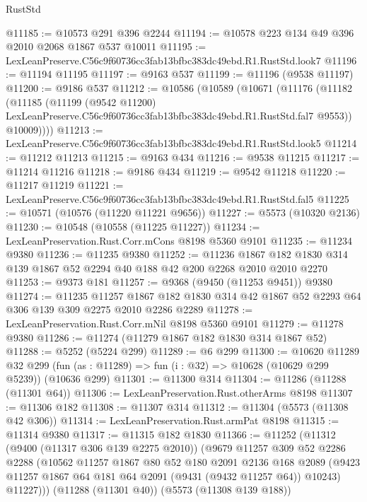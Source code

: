\begin{lexlean}{RustStd}
\begin{coremodule}
@11185 := @10573 @291 @396 @2244
@11194 := @10578 @223 @134 @49 @396 @2010 @2068 @1867 @537 @10011
@11195 := LexLeanPreserve.C56c9f60736cc3fab13bfbc383dc49ebd.R1.RustStd.look7
@11196 := @11194 @11195
@11197 := @9163 @537
@11199 := @11196 (@9538 @11197)
@11200 := @9186 @537
@11212 := @10586
    (@10589
      (@10671
        (@11176
          (@11182
            (@11185
              (@11199
                (@9542 @11200)
                LexLeanPreserve.C56c9f60736cc3fab13bfbc383dc49ebd.R1.RustStd.fal7
                @9553))
            @10009))))
@11213 := LexLeanPreserve.C56c9f60736cc3fab13bfbc383dc49ebd.R1.RustStd.look5
@11214 := @11212 @11213
@11215 := @9163 @434
@11216 := @9538 @11215
@11217 := @11214 @11216
@11218 := @9186 @434
@11219 := @9542 @11218
@11220 := @11217 @11219
@11221 := LexLeanPreserve.C56c9f60736cc3fab13bfbc383dc49ebd.R1.RustStd.fal5
@11225 := @10571 (@10576 (@11220 @11221 @9656))
@11227 := @5573 (@10320 @2136)
@11230 := @10548 (@10558 (@11225 @11227))
@11234 := LexLeanPreservation.Rust.Corr.mCons @8198 @5360 @9101
@11235 := @11234 @9380
@11236 := @11235 @9380
@11252 := @11236
    @1867
    @182
    @1830
    @314
    @139
    @1867
    @52
    @2294
    @40
    @188
    @42
    @200
    @2268
    @2010
    @2010
    @2270
@11253 := @9373 @181
@11257 := @9368 (@9450 (@11253 @9451)) @9380
@11274 := @11235
    @11257
    @1867
    @182
    @1830
    @314
    @42
    @1867
    @52
    @2293
    @64
    @306
    @139
    @309
    @2275
    @2010
    @2286
    @2289
@11278 := LexLeanPreservation.Rust.Corr.mNil @8198 @5360 @9101
@11279 := @11278 @9380
@11286 := @11274 (@11279 @1867 @182 @1830 @314 @1867 @52)
@11288 := @5252 (@5224 @299)
@11289 := @6 @299
@11300 := @10620
    @11289
    @32
    @299
    (fun (as : @11289) => fun (i : @32) => @10628 (@10629 @299 @5239))
    (@10636 @299)
@11301 := @11300 @314
@11304 := @11286 (@11288 (@11301 @64))
@11306 := LexLeanPreservation.Rust.otherArms @8198
@11307 := @11306 @182
@11308 := @11307 @314
@11312 := @11304 (@5573 (@11308 @42 @306))
@11314 := LexLeanPreservation.Rust.armPat @8198
@11315 := @11314 @9380
@11317 := @11315 @182 @1830
@11366 := @11252
    (@11312
      (@9400 (@11317 @306 @139 @2275 @2010))
      (@9679
        @11257
        @309
        @52
        @2286
        @2288
        (@10562
          @11257
          @1867
          @80
          @52
          @180
          @2091
          @2136
          @168
          @2089
          (@9423 @11257 @1867 @64 @181 @64 @2091 (@9431 (@9432 @11257 @64)) @10243)
          @11227)))
    (@11288 (@11301 @40))
    (@5573 (@11308 @139 @188))

\end{coremodule}
\end{lexlean}
